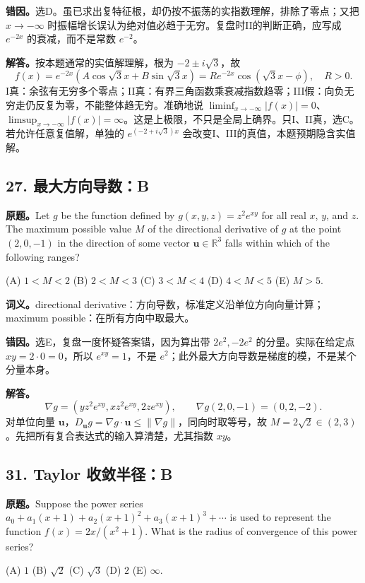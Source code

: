\documentclass[11pt,a4paper,fontset=fandol]{ctexart}
\begin{document}
\textbf{错因。}选D。虽已求出复特征根，却仍按不振荡的实指数理解，排除了零点；又把 $x\to-\infty$ 时振幅增长误认为绝对值必趋于无穷。复盘时II的判断正确，应写成 $e^{-2x}$ 的衰减，而不是常数 $e^{-2}$。

\textbf{解答。}按本题通常的实值解理解，根为 $-2\pm i\sqrt3$，故
\[
f(x)=e^{-2x}(A\cos\sqrt3x+B\sin\sqrt3x)
=Re^{-2x}\cos(\sqrt3x-\phi),\quad R>0.
\]
I真：余弦有无穷多个零点；II真：有界三角函数乘衰减指数趋零；III假：向负无穷走仍反复为零，不能整体趋无穷。准确地说 $\liminf_{x\to-\infty}|f(x)|=0$、$\limsup_{x\to-\infty}|f(x)|=\infty$。这是上极限，不只是全局上确界。只I、II真，选C。若允许任意复值解，单独的 $e^{(-2+i\sqrt3)x}$ 会改变I、III的真值，本题预期隐含实值解。

\subsection{27. 最大方向导数：B}
\label{ms:q27}
\textbf{原题。}Let $g$ be the function defined by $g(x,y,z)=z^2e^{xy}$ for all real $x$, $y$, and $z$. The maximum possible value $M$ of the directional derivative of $g$ at the point $(2,0,-1)$ in the direction of some vector $\mathbf u\in\mathbb R^3$ falls within which of the following ranges?

(A) $1<M<2$ \quad (B) $2<M<3$ \quad (C) $3<M<4$ \quad (D) $4<M<5$ \quad (E) $M>5$.

\textbf{词义。}directional derivative：方向导数，标准定义沿单位方向向量计算；maximum possible：在所有方向中取最大。

\textbf{错因。}选E，复盘一度怀疑答案错，因为算出带 $2e^2,-2e^2$ 的分量。实际在给定点 $xy=2\cdot0=0$，所以 $e^{xy}=1$，不是 $e^2$；此外最大方向导数是梯度的模，不是某个分量本身。

\textbf{解答。}
\[
\nabla g=(yz^2e^{xy},xz^2e^{xy},2ze^{xy}),\qquad
\nabla g(2,0,-1)=(0,2,-2).
\]
对单位向量 $\mathbf u$，$D_{\mathbf u}g=\nabla g\cdot\mathbf u\le\|\nabla g\|$，同向时取等号，故 $M=2\sqrt2\in(2,3)$。先把所有复合表达式的输入算清楚，尤其指数 $xy$。

\subsection{31. Taylor 收敛半径：B}
\label{ms:q31}
\textbf{原题。}Suppose the power series $a_0+a_1(x+1)+a_2(x+1)^2+a_3(x+1)^3+\cdots$ is used to represent the function $f(x)=2x/(x^2+1)$. What is the radius of convergence of this power series?

(A) $1$ \quad (B) $\sqrt2$ \quad (C) $\sqrt3$ \quad (D) $2$ \quad (E) $\infty$.
\end{document}

